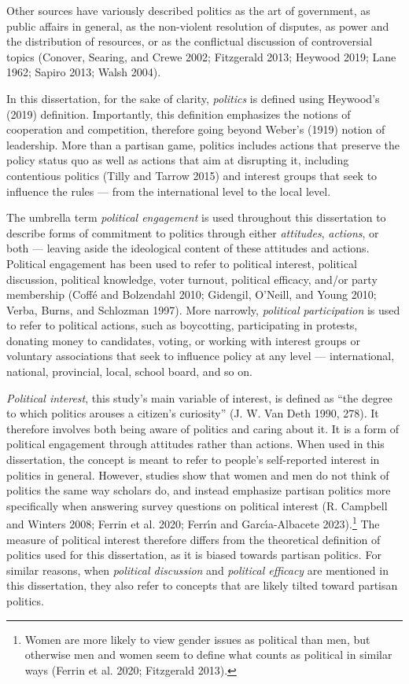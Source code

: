 \documentclass[
  letterpaper,
  DIV=11,
  numbers=noendperiod]{scrreprt}
\begin{document}
Other sources have variously described politics as the art of
government, as public affairs in general, as the non-violent resolution
of disputes, as power and the distribution of resources, or as the
conflictual discussion of controversial topics (Conover, Searing, and
Crewe 2002; Fitzgerald 2013; Heywood 2019; Lane 1962; Sapiro 2013; Walsh
2004).

In this dissertation, for the sake of clarity, \emph{politics} is
defined using Heywood's (2019) definition. Importantly, this definition
emphasizes the notions of cooperation and competition, therefore going
beyond Weber's (1919) notion of leadership. More than a partisan game,
politics includes actions that preserve the policy status quo as well as
actions that aim at disrupting it, including contentious politics (Tilly
and Tarrow 2015) and interest groups that seek to influence the rules
--- from the international level to the local level.

The umbrella term \emph{political engagement} is used throughout this
dissertation to describe forms of commitment to politics through either
\emph{attitudes}, \emph{actions}, or both --- leaving aside the
ideological content of these attitudes and actions. Political engagement
has been used to refer to political interest, political discussion,
political knowledge, voter turnout, political efficacy, and/or party
membership (Coffé and Bolzendahl 2010; Gidengil, O'Neill, and Young
2010; Verba, Burns, and Schlozman 1997). More narrowly, \emph{political
participation} is used to refer to political actions, such as
boycotting, participating in protests, donating money to candidates,
voting, or working with interest groups or voluntary associations that
seek to influence policy at any level --- international, national,
provincial, local, school board, and so on.

\emph{Political interest}, this study's main variable of interest, is
defined as ``the degree to which politics arouses a citizen's
curiosity'' (J. W. Van Deth 1990, 278). It therefore involves both being
aware of politics and caring about it. It is a form of political
engagement through attitudes rather than actions. When used in this
dissertation, the concept is meant to refer to people's self-reported
interest in politics in general. However, studies show that women and
men do not think of politics the same way scholars do, and instead
emphasize partisan politics more specifically when answering survey
questions on political interest (R. Campbell and Winters 2008; Ferrin et
al. 2020; Ferrı́n and Garcı́a-Albacete 2023).\footnote{Women are more
  likely to view gender issues as political than men, but otherwise men
  and women seem to define what counts as political in similar ways
  (Ferrin et al. 2020; Fitzgerald 2013).} The measure of political
interest therefore differs from the theoretical definition of politics
used for this dissertation, as it is biased towards partisan politics.
For similar reasons, when \emph{political discussion} and
\emph{political efficacy} are mentioned in this dissertation, they also
refer to concepts that are likely tilted toward partisan politics.
\end{document}
